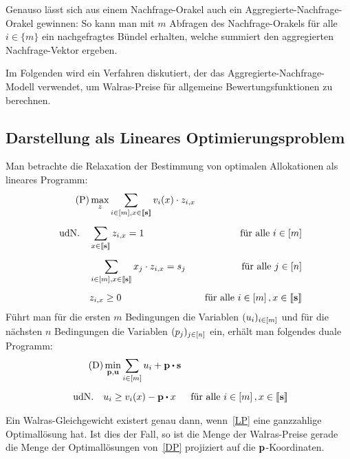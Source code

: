 Genauso lässt sich aus einem Nachfrage-Orakel auch ein Aggregierte-Nachfrage-Orakel gewinnen: So kann man mit $m$ Abfragen des Nachfrage-Orakels für alle $i\in\{m\}$ ein nachgefragtes Bündel erhalten, welche summiert den aggregierten Nachfrage-Vektor ergeben.

Im Folgenden wird ein Verfahren diskutiert, der das Aggregierte-Nachfrage-Modell verwendet, um Walras-Preise für allgemeine Bewertungsfunktionen zu berechnen.

\subsection{Darstellung als Lineares Optimierungsproblem}

Man betrachte die Relaxation der Bestimmung von optimalen Allokationen als lineares Programm:
\begin{align*}
	\tag{P}\label{LP}
	&\max_{z} \sum_{i\in\left[ m \right], x\in\left\llbracket \mathbf{s} \right\rrbracket} v_i(x) \cdot z_{i, x} \\[5pt]
	\text{udN.} \quad & \sum_{x\in\left\llbracket \mathbf{s} \right\rrbracket} z_{i, x} = 1 & \text{für alle $i\in\left[ m \right]$}\\[5pt]
	& \sum_{i\in\left[ m \right], x\in\left\llbracket \mathbf{s} \right\rrbracket} x_j \cdot z_{i,x} = s_j & \text{für alle $j\in\left[ n \right]$} \\[5pt]
	& z_{i, x} \geq 0 &\text{für alle $i\in\left[ m \right], x\in\left\llbracket \mathbf{s} \right\rrbracket$}
\end{align*}
Führt man für die ersten $m$ Bedingungen die Variablen $(u_i)_{i\in\left[ m \right]}$ und für die nächsten $n$ Bedingungen die Variablen $(p_j)_{j\in\left[ n \right]}$ ein, erhält man folgendes duale Programm:
\begin{align*}
\tag{D}\label{DP}
&\min_{\fp,\fu} \sum_{i\in\first{m}} u_i + \fp \bcdot \fs \\[5pt]
\text{udN.} \quad &  u_i \geq v_i(x) - \fp \bcdot x & \text{für alle $i\in\first{m}, x\in\ffirst{\fs}$}
\end{align*}
\begin{lemma}
	Ein Walras-Gleichgewicht existert genau dann, wenn~\eqref{LP} eine ganzzahlige Optimallösung hat.
	Ist dies der Fall, so ist die Menge der Walras-Preise gerade die Menge der Optimallösungen von~\eqref{DP} projiziert auf die $\mathbf{p}$-Koordinaten.
\end{lemma}
